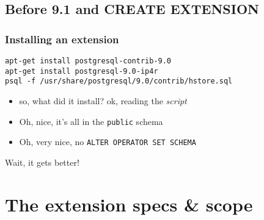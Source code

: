 \documentclass[english]{beamer}
\begin{document}
\subsection{Before 9.1 and CREATE EXTENSION}

\begin{frame}[fragile]
  \frametitle{Installing an extension}

  \begin{example}
\begin{verbatim}
apt-get install postgresql-contrib-9.0
apt-get install postgresql-9.0-ip4r
psql -f /usr/share/postgresql/9.0/contrib/hstore.sql
\end{verbatim}
  \end{example}

  \begin{itemize}
    \item<2-> so, what did it install? ok, reading the \textit{script}
    \item<3-> Oh, nice, it's all in the \texttt{public} schema
    \item<4-> Oh, very nice, no \texttt{ALTER OPERATOR SET SCHEMA}
  \end{itemize}

  \begin{center}
    Wait, it gets better!
  \end{center}
\end{frame}


\section{The extension specs \& scope}
\end{document}
